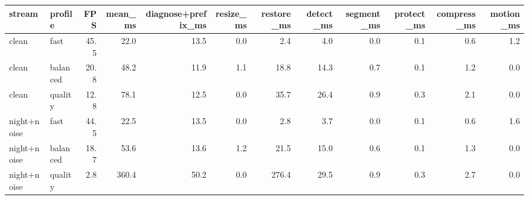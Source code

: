 \begin{tabular}{llrrrrrrrrrr}
\toprule
stream & profile & FPS & mean_ms & diagnose+prefix_ms & resize_ms & restore_ms & detect_ms & segment_ms & protect_ms & compress_ms & motion_ms \\
\midrule
clean & fast & 45.5 & 22.0 & 13.5 & 0.0 & 2.4 & 4.0 & 0.0 & 0.1 & 0.6 & 1.2 \\
clean & balanced & 20.8 & 48.2 & 11.9 & 1.1 & 18.8 & 14.3 & 0.7 & 0.1 & 1.2 & 0.0 \\
clean & quality & 12.8 & 78.1 & 12.5 & 0.0 & 35.7 & 26.4 & 0.9 & 0.3 & 2.1 & 0.0 \\
night+noise & fast & 44.5 & 22.5 & 13.5 & 0.0 & 2.8 & 3.7 & 0.0 & 0.1 & 0.6 & 1.6 \\
night+noise & balanced & 18.7 & 53.6 & 13.6 & 1.2 & 21.5 & 15.0 & 0.6 & 0.1 & 1.3 & 0.0 \\
night+noise & quality & 2.8 & 360.4 & 50.2 & 0.0 & 276.4 & 29.5 & 0.9 & 0.3 & 2.7 & 0.0 \\
\bottomrule
\end{tabular}
